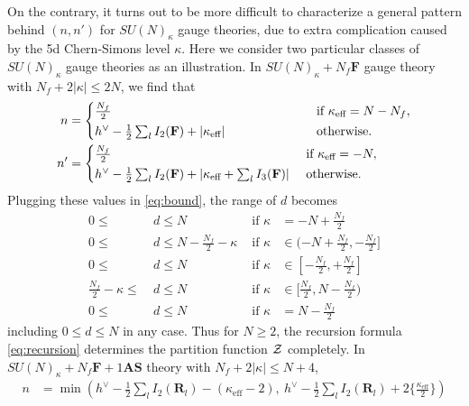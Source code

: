 \documentclass[letterpaper, 11pt]{article}
\newcommand{\nn}{\nonumber}
\def\CZ{{\cal Z}}
\def\k{\kappa}
\begin{document}
{On the contrary, it turns out to be more difficult to characterize a general pattern behind $(n, n')$ for $SU(N)_\kappa$ gauge theories, due to extra complication caused by the 5d Chern-Simons level $\kappa$. Here we consider two particular classes of $SU(N)_\kappa$ gauge theories as an illustration.  In $SU(N)_\kappa + N_f\mathbf{F}$ gauge theory with $N_f + 2|\kappa| \leq 2N$, we find that 
\begin{align}
  \label{eq:sun-nf}
  n &= \begin{dcases}
  \textstyle \frac{N_f}{2}
  & \hspace{2.1cm} \textstyle\text{ if }  \kappa_\text{eff} = N - N_f, \\
  \textstyle h^\vee - \frac{1}{2} \sum_{l}I_2(\mathbf{F}) + |\k_\text{eff}| 
  & \hspace{2.1cm}\textstyle\text{ otherwise}.
  \end{dcases}\\
  n' &=
    \begin{dcases}
     \textstyle \frac{N_f}{2}
    &  \textstyle\text{ if }  \kappa_\text{eff} = -N, \\
    \textstyle h^\vee - \frac{1}{2} \sum_{l}I_2(\mathbf{F}) + \left|\k_\text{eff} + \sum_{l}I_3(\mathbf{F})\right| 
    &  \textstyle\text{ otherwise} \nn.
    \end{dcases}  
\end{align}
Plugging these values in \eqref{eq:bound}, the range of $d$ becomes
\begin{align}
  \label{eq:sun-nf-range}
  0 \leq &\ d \leq N &\text{ if } \kappa &= -N + \tfrac{N_f}{2} \nn \\
  0 \leq &\ d \leq N-\tfrac{N_f}{2}-\kappa &\text{ if } \kappa & \in (-N +\tfrac{N_f}{2}, -\tfrac{N_f}{2}] \nn \\
  0 \leq &\ d \leq N &\text{ if } \kappa &\in [-\tfrac{N_f}{2}, +\tfrac{N_f}{2}] \\
  \tfrac{N_f}{2}-\kappa \leq &\ d \leq N & \text{ if } \kappa &\in [\tfrac{N_f}{2}, N -\tfrac{N_f}{2})  \nn \\
  0 \leq &\ d \leq N & \text{ if } \kappa &= N -\tfrac{N_f}{2}  \nn 
\end{align}
including $0 \leq d \leq N$ in any case. Thus for $N\geq 2$,  the recursion formula \eqref{eq:recursion} determines the partition function $\CZ$ completely.
In $SU(N)_\kappa + N_f\mathbf{F} + 1\mathbf{AS}$  theory with $N_f + 2|\kappa| \leq N+4$, 
\begin{align}
  \label{eq:sun-nf-na}
  n &= \min \textstyle 
  \left(h^\vee - \frac{1}{2} \sum_{l}I_2(\mathbf{R}_l) - (\k_\text{eff}-2),\ h^\vee - \frac{1}{2} \sum_{l}I_2(\mathbf{R}_l) + 2\{\frac{\k_\text{eff}}{2}\}\right)\nn \\

\end{align}}
\end{document}
